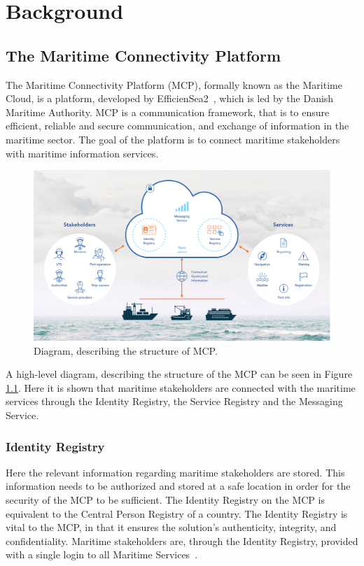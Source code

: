 \chapter{Background}

\section{The Maritime Connectivity Platform}
The Maritime Connectivity Platform (MCP), formally known as the Maritime Cloud, is a platform, developed by EfficienSea2~\cite{efficienSea2}, which is led by the Danish Maritime Authority. 
MCP is a communication framework, that is to ensure efficient, reliable and secure communication, and exchange of information in the maritime sector.
The goal of the platform is to connect maritime stakeholders with maritime information services.
\begin{figure}
	\includegraphics[width=1\textwidth]{figures/MCPStructure}
	\caption{Diagram, describing the structure of MCP\cite{efficienSea2}.}
	\label{fig:MCPStruct}
\end{figure}\noindent
A high-level diagram, describing the structure of the MCP can be seen in Figure \ref{fig:MCPStruct}. Here it is shown that maritime stakeholders are connected with the maritime services through the Identity Registry, the Service Registry and the Messaging Service.

\subsection{Identity Registry}
Here the relevant information regarding maritime stakeholders are stored. This information needs to be authorized and stored at a safe location in order for the security of the MCP to be sufficient. The Identity Registry on the MCP is equivalent to the Central Person Registry of a country. The Identity Registry is vital to the MCP, in that it ensures the solution's authenticity, integrity, and confidentiality. Maritime stakeholders are, through the Identity Registry, provided with a single login to all Maritime Services~\cite{efficienSea2}.
